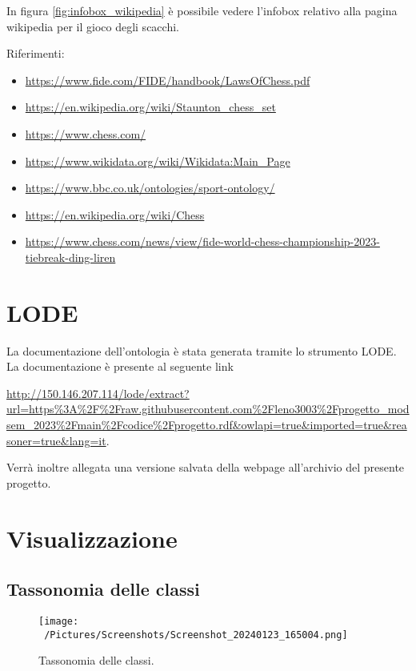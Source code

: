 \documentclass[12pt]{book}
\begin{document}
In figura \ref{fig:infobox_wikipedia} è possibile vedere l'infobox
relativo alla pagina wikipedia per il gioco degli scacchi.

Riferimenti:
\begin{itemize}

  \item \url{https://www.fide.com/FIDE/handbook/LawsOfChess.pdf}
  \item \url{https://en.wikipedia.org/wiki/Staunton_chess_set}
  \item \url{https://www.chess.com/}
  \item \url{https://www.wikidata.org/wiki/Wikidata:Main_Page}
  \item \url{https://www.bbc.co.uk/ontologies/sport-ontology/}
  \item \url{https://en.wikipedia.org/wiki/Chess}
  \item \url{https://www.chess.com/news/view/fide-world-chess-championship-2023-tiebreak-ding-liren}

\end{itemize}


\chapter{LODE}

La documentazione dell'ontologia è stata generata tramite lo strumento
LODE. La documentazione è presente al seguente link 

\begin{tcolorbox}[]

\url{http://150.146.207.114/lode/extract?url=https%3A%2F%2Fraw.githubusercontent.com%2Fleno3003%2Fprogetto_modsem_2023%2Fmain%2Fcodice%2Fprogetto.rdf&owlapi=true&imported=true&reasoner=true&lang=it}.

\end{tcolorbox}

Verrà inoltre allegata una versione salvata della webpage
all'archivio del presente progetto.

\chapter{Visualizzazione}

\section{Tassonomia delle classi}
\begin{figure}[h]
  \caption{Tassonomia delle classi.}
  \centering
  \label{fig:tassonomia}
  \texttt{[image: ~/Pictures/Screenshots/Screenshot\_20240123\_165004.png]}
\end{figure} 
\end{document}

